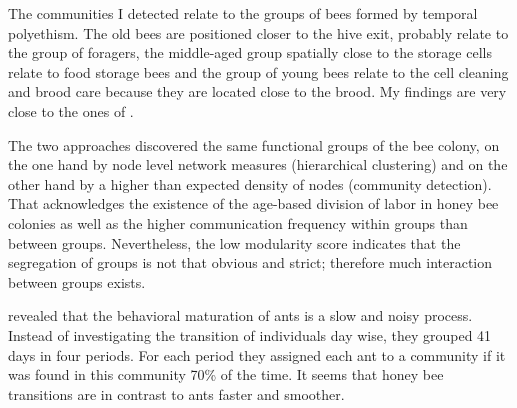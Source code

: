 The communities I detected relate to the groups of bees formed by temporal polyethism. The old bees are positioned closer to the hive exit, probably relate to the group of foragers, the middle-aged group spatially close to the storage cells relate to food storage bees and the group of young bees relate to the cell cleaning and brood care because they are located close to the brood. My findings are very close to the ones of \textcite{baracchi2014socio}.

The two approaches discovered the same functional groups of the bee colony, on the one hand by node level network measures (hierarchical clustering) and on the other hand by a higher than expected density of nodes (community detection).
That acknowledges the existence of the age-based division of labor in honey bee colonies as well as the higher communication frequency within groups than between groups. Nevertheless, the low modularity score indicates that the segregation of groups is not that obvious and strict; therefore much interaction between groups exists.

\textcite{mersch2013tracking} revealed that the behavioral maturation of ants is a slow and noisy process. Instead of investigating the transition of individuals day wise, they grouped 41 days in four periods. For each period they assigned each ant to a community if it was found in this community 70\% of the time.
It seems that honey bee transitions are in contrast to ants faster and smoother.